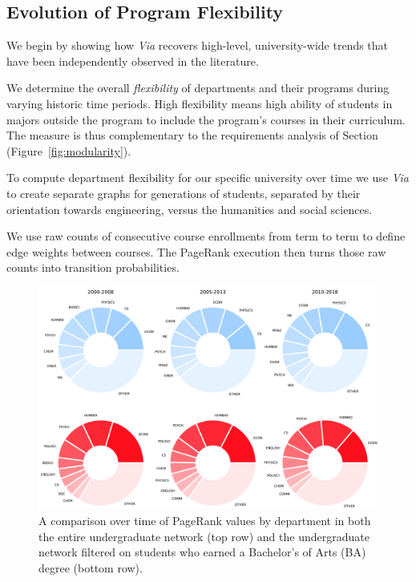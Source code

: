 \subsection{Evolution of Program Flexibility}
\label{sec:course_pref_evolution}

We begin by showing how {\em Via} recovers high-level, university-wide
trends that have been independently observed in the literature.

We determine the overall {\em flexibility} of departments and their
programs during varying historic time periods. High flexibility means
high ability of students in majors outside the program to include the
program's courses in their curriculum. The measure is thus
complementary to the requirements analysis of
Section~ (Figure~\ref{fig:modularity}).

To compute department flexibility for our specific university over
time we use {\em Via} to create separate graphs for generations of
students, separated by their orientation towards engineering, versus
the humanities and social sciences.

We use raw counts of consecutive course enrollments from term to term
to define edge weights between courses. The PageRank execution then
turns those raw counts into transition probabilities.

\begin{figure}
    \centering
    \includegraphics[width=\columnwidth]{Figs/final-evolution.pdf}
    \caption{A comparison over time of PageRank values by department
      in both the entire undergraduate network (top row) and the
      undergraduate network filtered on students who earned a
      Bachelor's of Arts (BA) degree (bottom row).}
    \label{fig:evolution}
\end{figure}

